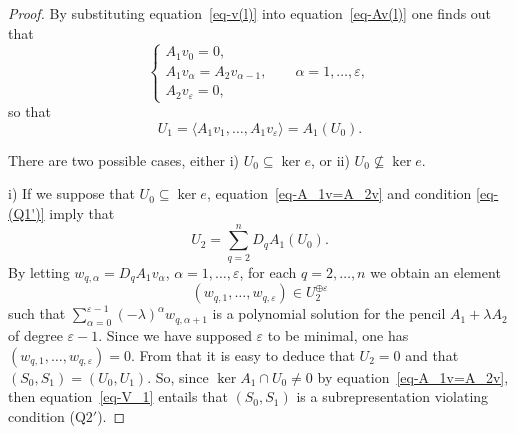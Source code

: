 \begin{proof}
By substituting equation~\eqref{eq-v(l)} into equation~\eqref{eq-Av(l)} one finds out that
\begin{equation}
 \begin{cases}
A_{1}v_{0} =0,\\
A_{1}v_{\alpha} =A_{2}v_{\alpha-1},\qquad \alpha=1,\dots,\varepsilon,\\
A_{2}v_{\varepsilon} =0,
\end{cases}
\label{eq-A_1v=A_2v}
\end{equation}
so that
\begin{equation}
U_{1}=\langle A_{1}v_{1},\dots,A_{1}v_{\varepsilon} \rangle=A_{1}(U_{0}) .
\label{eq-V_1}
\end{equation}

There are two possible cases, either i) $U_{0}\subseteq\ker e$, or ii) $U_{0}\not\subseteq\ker e$.

i) If we suppose that
$U_{0}\subseteq\ker e$,
equation~\eqref{eq-A_1v=A_2v} and condition \eqref{eq-(Q1')} imply that
\begin{equation*}
U_{2}=\sum_{q=2}^{n}D_{q}A_{1}(U_{0}) .
\end{equation*}
By letting $w_{q,\alpha}=D_{q}A_{1}v_{\alpha}$, $\alpha=1,\dots,\varepsilon$,
for each $q=2,\dots,n$ we obtain an
 element \[(w_{q,1},\dots,w_{q,\varepsilon})\in U_2^{\oplus\varepsilon} \]
 such that $\sum\limits_{\alpha=0}^{\varepsilon-1}(-\lambda)^{\alpha}w_{q,\alpha+1}$ is a polynomial solution for the pencil $A_{1}+\lambda A_{2}$ of degree $\varepsilon - 1$. Since we have supposed $\varepsilon$ to be minimal, one has
 $(w_{q,1},\dots,w_{q,\varepsilon}) = 0$. From that it is easy to deduce that $U_2 =0$ and that $(S_0, S_1) = (U_0,U_1)$.
 So, since $\ker A_1 \cap U_0 \neq 0$ by equation~\eqref{eq-A_1v=A_2v}, then
 equation~\eqref{eq-V_1} entails that $(S_{0},S_{1})$ is a subrepresentation violating condition (Q$2'$).


\end{proof}
